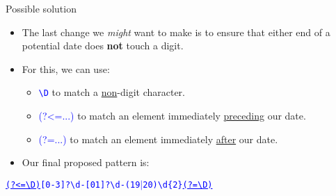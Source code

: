 \documentclass[
	usenames,
	dvipsnames,
] {beamer}
\newcommand{\reDigit}{\textbackslash{}d}
\newcommand{\reNonDigit}{\textbackslash{}D}
\newcommand{\rePattern}[1]{{\Large\texttt{\textcolor{blue}{#1}}}}
\begin{document}
\begin{frame}{Possible solution}
	\begin{itemize}[label=\textbullet]
		\item The last change we \textit{might} want to make is to ensure that either end of a potential date does \textbf{not} touch a digit.
		      \pause
		\item For this, we can use:
		      \pause
		      \begin{itemize}[label=\textendash]
			      	\item \rePattern{\reNonDigit} to match a \underline{non}-digit character. \\
					\pause
			      	      \medskip			      	      
			      	\item {\Large\textcolor{blue}{(?\textless=...)}} to match an element immediately \underline{preceding} our date. \\
					\pause
			      	      \medskip			      	      
			      	\item {\Large\textcolor{blue}{(?=...)}} to match an element immediately \underline{after} our date. \\
			      		\pause
			      	      \medskip			      	      
		      \end{itemize}
		\item Our final proposed pattern is: \\
		      \bigskip
	\end{itemize}
	
	\rePattern{\underline{(?\textless=\reNonDigit)}[0-3]?\reDigit-[01]?\reDigit-(19$|$20)\reDigit\{2\}\underline{(?=\reNonDigit)}}
\end{frame}
\end{document}
